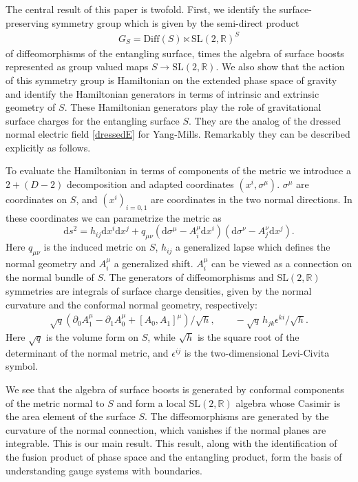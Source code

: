 \documentclass[a4paper,11pt]{article}
\newcommand{\be}{\begin{equation}}
\newcommand{\ee}{\end{equation}}
\newcommand{\beq}{\begin{eqnarray}}
\newcommand{\eeq}{\end{eqnarray}}
\def\rd{\mathrm{d}}
\newcommand{\slr}{\text{SL}(2,\mathbb{R})}
\begin{document}
The central result of this paper is twofold.
First, we identify the surface-preserving symmetry group which is given by the semi-direct product 
\beq
G_S =\text{Diff}(S) \ltimes \slr^S
\eeq 
of diffeomorphisms of the entangling surface, times the algebra of surface boosts represented as group valued maps  $S\to \slr$. 
We also show that the action of this symmetry group is Hamiltonian on the extended phase space of gravity and identify the Hamiltonian generators in terms of intrinsic and extrinsic geometry of $S$. 
These Hamiltonian generators play the role of gravitational surface charges for the entangling surface $S$. They are the analog of the dressed normal electric field \eqref{dressedE} for Yang-Mills.
Remarkably they can be described explicitly as follows.

To evaluate the Hamiltonian in terms of components of the metric we introduce a $2+(D-2)$ decomposition and adapted coordinates $(x^i,\sigma^\mu)$.
 $\sigma^\mu$ are coordinates on $S$, and  $(x^{i})_{i=0,1}$ are  coordinates in the two normal directions.
In these coordinates we can parametrize the metric as
\be
\rd s^{2} = h_{ij}\rd x^{i}\rd x^{j} + q_{\mu \nu}\left(\rd \sigma^{\mu} - A^{\mu}_{i}\rd x^{i}\right)
\left(\rd \sigma^\nu - A^\nu_j\rd x^{j}\right).
\ee
Here $q_{\mu \nu}$ is the induced metric on $S$, $h_{ij}$ a generalized lapse which defines the normal geometry and $A_i^\mu$ a generalized shift.
$A_i^\mu$ can be viewed as a connection on the normal bundle of $S$. 
The generators of diffeomorphisms and $\slr$ symmetries are integrals of surface charge densities, given by the normal curvature and the conformal normal geometry, respectively:
\beq
{\sqrt{q}} \left(\partial_{0}A_1^\mu-\partial_1A_0^\mu +[A_{0}, A_1]^\mu\right)/{\sqrt{h}},\qquad 
- \sqrt{q} \, h_{jk}\epsilon^{ki}/{\sqrt{h}}.
\eeq
Here $\sqrt{q}$ is the volume form on $S$, while $\sqrt{h}$ is the square root of the determinant of the normal metric, and $\epsilon^{ij}$ is the two-dimensional Levi-Civita symbol.

We see that the algebra of surface boosts is generated by conformal components of the metric normal to $S$ and form a local $\slr$ algebra whose Casimir is the area element of the surface $S$.
The diffeomorphisms are generated by the curvature of the normal connection, which vanishes if the normal planes are integrable. 
This is our main result.
This result, along with the identification of the fusion product of phase space and the entangling product, form the basis of understanding gauge systems with boundaries.
\end{document}
